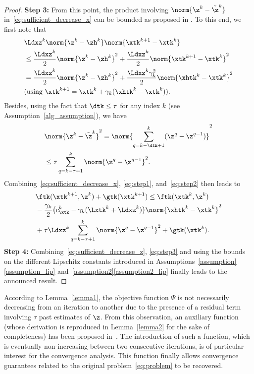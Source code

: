 \begin{proof}
\textbf{Step 3:} From this point, the product involving $\norm{\z^k - \tilde{\z}^k}$ in~\eqref{eq:sufficient_decrease_x} can be bounded as proposed in \cite[Theorem 5.1]{Davis2016}. To this end, we first note that
%
\begin{align} \label{eq:step1}
    & \Ldxz^k \norm{\z^k - \zh^k} \norm{\xtk^{k+1} - \xtk^k} \nonumber \\
    & \leq \frac{\Ldxz^k}{2} \norm{\z^k - \zh^k}^2 + \frac{\Ldxz^k}{2} \norm{\xtk^{k+1} - \xtk^k}^2 \nonumber \\
    & = \frac{\Ldxz^k}{2} \norm{\z^k - \zh^k}^2 + \frac{\Ldxz^k \gamma_k^2}{2} \norm{\xhtk^k - \xtk^k}^2  \nonumber \\
    & \text{(using $\xtk^{k+1} = \xtk^{k} + \gamma_k (\xhtk^{k} - \xtk^{k})$)}. 
\end{align}
%
Besides, using the fact that $\dtk \leq \tau$ for any index $k$ (see Assumption~\ref{alg_assumption}), we have
%
\begin{align} \label{eq:step2}
&\norm{\z^k - \tilde{\z}^k}^2 = \norm{\sum_{q = k-\dtk+1}^k (\z^q - \z^{q - 1})}^2 \nonumber \\
& \leq \tau \sum_{q = k-\tau+1}^k \norm{\z^q - \z^{q - 1}}^2.
\end{align}
%
Combining~\eqref{eq:sufficient_decrease_x}, \eqref{eq:step1}, and~\eqref{eq:step2} then leads to
%
\begin{align} \label{eq:step3}
    \begin{split}
    & \ftk (\xtk^{k+1}, \z^k) + \gtk (\xtk^{k+1}) \leq \ftk (\xtk^k, \z^k) \\
    & - \frac{\gamma_k}{2} \bigl( c_{\xtk}^k - \gamma_k (\Lxtk^k + \Ldxz^k )  \bigr) \norm{\xhtk^k - \xtk^k}^2 \\
    & + \tau \Ldxz^k \sum_{q = k-\tau+1}^k \norm{\z^q - \z^{q - 1}}^2 + \gtk(\xtk^k) .
    \end{split}
\end{align}
%
\textbf{Step 4:} Combining~\eqref{eq:sufficient_decrease_z}, \eqref{eq:step3} and using the bounds on the different Lipschitz constants introduced in Assumptions~\ref{assumption}\ref{assumption_lip} and~\ref{assumption2}\ref{assumption2_lip} finally leads to the announced result.
\end{proof}

According to Lemma~\ref{lemma1}, the objective function $\Psi$ is not necessarily decreasing from an iteration to another due to the presence of a residual term involving $\tau$ past estimates of $\z$. From this observation, an auxiliary function (whose derivation is reproduced in Lemma~\ref{lemma2} for the sake of completeness) has been proposed in~\cite{Davis2016}. The introduction of such a function, which is eventually non-increasing between two consecutive iterations, is of particular interest for the convergence analysis. This function finally allows convergence guarantees related to the original problem~\eqref{eq:problem} to be recovered.

